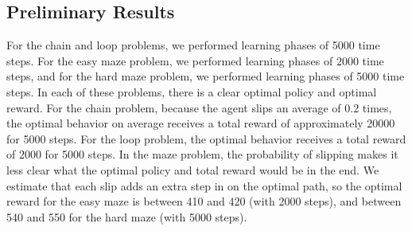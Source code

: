 \documentclass[10pt, twocolumn, twoside]{article}
\begin{document}
\subsection{Preliminary Results}
For the chain and loop problems, we performed learning phases of 5000 time steps. For
the easy maze problem, we performed learning phases of 2000 time steps, and for the hard
maze problem, we performed learning phases of 5000 time steps. In each of these
problems, there is a clear optimal policy and optimal reward. For the chain problem,
because the agent slips an average of 0.2 times, the optimal behavior on average receives
a total reward of approximately 20000 for 5000 steps. For the loop problem, the optimal
behavior receives a total reward of 2000 for 5000 steps. In the maze problem, the
probability of slipping makes it less clear what the optimal policy and total reward
would be in the end. We estimate that each slip adds an extra step in on the optimal
path, so the optimal reward for the easy maze is between 410 and 420 (with 2000 steps),
and between 540 and 550 for the hard maze (with 5000 steps).




\end{document}
